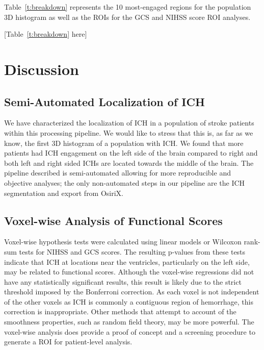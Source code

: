 \documentclass[10pt]{article}\usepackage[]{graphicx}\usepackage[]{color}
\begin{document}
Table~\ref{t:breakdown} represents the 10 most-engaged regions for the population 3D histogram as well as the ROIs for the GCS and NIHSS score ROI analyses.  

[Table~\ref{t:breakdown} here]


\section{Discussion}


\subsection{Semi-Automated Localization of ICH}

We have characterized the localization of ICH in a population of stroke patients within this processing pipeline.  We would like to stress that this is, as far as we know, the first 3D histogram of a population with ICH.  We found that more patients had ICH engagement on the left side of the brain compared to right and both left and right sided ICHs are located towards the middle of the brain.  
The pipeline described is semi-automated allowing for more reproducible and objective analyses; the only non-automated steps in our pipeline are the ICH segmentation and export from OsiriX.  


 



\subsection{Voxel-wise Analysis of Functional Scores}

Voxel-wise hypothesis tests were calculated using linear models or Wilcoxon rank-sum tests for NIHSS and GCS scores.  The resulting p-values from these tests indicate that ICH at locations near the ventricles, particularly on the left side, may be related to functional scores.  Although the voxel-wise regressions did not have any statistically significant results, this result is likely due to the strict threshold imposed by the Bonferroni correction.  As each voxel is not independent of the other voxels as ICH is commonly a contiguous region of hemorrhage, this correction is inappropriate.  Other methods that attempt to account of the smoothness properties, such as random field theory, may be more powerful.  The voxel-wise analysis does provide a proof of concept and a screening procedure to generate a ROI for patient-level analysis.
\end{document}
